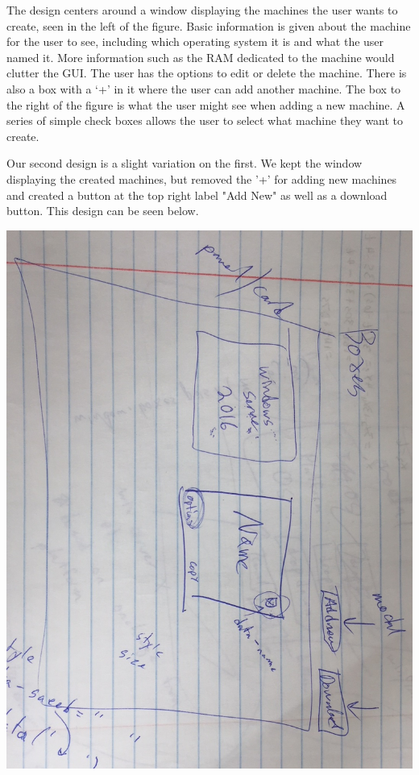 \documentclass[openright]{report}
\begin{document}
\par The design centers around a window displaying the machines the user wants to create, seen in the left of the figure. Basic information is given about the machine for the user to see, including which operating system it is and what the user named it. More information such as the RAM dedicated to the machine would clutter the GUI. The user has the options to edit or delete the machine. There is also a box with a `+' in it where the user can add another machine. The box to the right of the figure is what the user might see when adding a new machine. A series of simple check boxes allows the user to select what machine they want to create.

\par Our second design is a slight variation on the first. We kept the window displaying the created machines, but removed the '+' for adding new machines and created a button at the top right label "Add New" as well as a download button. This design can be seen below.

\begin{center}
    \includegraphics[scale=0.25, angle=90]{images/mainDesign.JPG}
    \label{design2}
\end{center}
\end{document}
